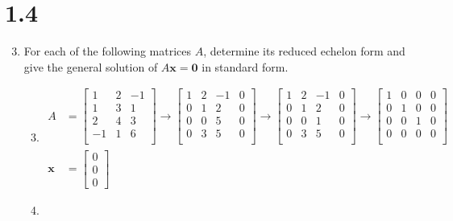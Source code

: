 \documentclass[letterpaper]{article}
\begin{document}
\section*{1.4}
\begin{enumerate}
\setcounter{enumi}{2}
\item
For each of the following matrices $A$, determine its reduced echelon form and give the general solution of $A\mathbf{x}=\mathbf{0}$ in standard form.
  \begin{enumerate}
  \setcounter{enumii}{2}
  \item
  \begin{align*}
    A&=
    \left[\begin{array}{ccc}
      1&2&-1\\
      1&3&1\\
      2&4&3\\
      -1&1&6\\
    \end{array}\right]
    \to
    \left[\begin{array}{ccc|c}
      1&2&-1&0\\
      0&1&2&0\\
      0&0&5&0\\
      0&3&5&0\\
    \end{array}\right]
    \to
    \left[\begin{array}{ccc|c}
      1&2&-1&0\\
      0&1&2&0\\
      0&0&1&0\\
      0&3&5&0\\
    \end{array}\right]
    \to
    \left[\begin{array}{ccc|c}
      1&0&0&0\\
      0&1&0&0\\
      0&0&1&0\\
      0&0&0&0\\
    \end{array}\right]\\
    \mathbf{x}&=\left[\begin{array}{c}0\\0\\0\end{array}\right]
  \end{align*}
  \item

\end{enumerate}
\end{enumerate}
\end{document}
